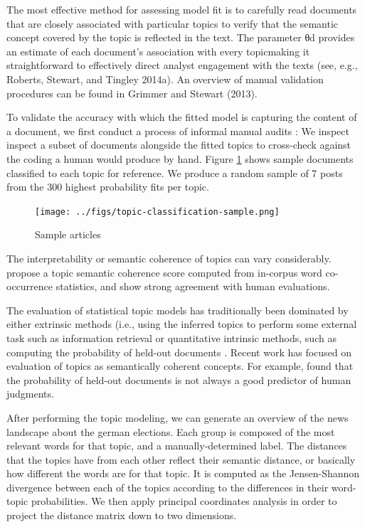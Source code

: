 \documentclass[12pt,a4paper,notitlepage]{article}
\begin{document}
The most effective method for assessing model fit is to carefully read documents that are closely associated with particular topics to verify that the semantic concept covered by the topic is reflected in the text. The parameter θd provides an estimate of each document’s association with every topicmaking it straightforward to effectively direct analyst engagement with the texts (see, e.g., Roberts, Stewart, and Tingley 2014a). An overview of manual validation procedures can be found in Grimmer and Stewart (2013).\cite{roberts_model_2016}

To validate the accuracy with which the fitted model is capturing the content of a document, we first conduct a process of informal manual audits \citep{gentzkow_text_2017}: We inspect inspect a subset of documents alongside the fitted topics to cross-check against the coding a human would produce by hand. Figure \ref{fig_classification} shows sample documents classified to each topic for reference. We produce a random sample of 7 posts from the 300 highest probability fits per topic.

\begin{figure}[H]
\centering
	\caption{Sample articles}
	\texttt{[image: ../figs/topic-classification-sample.png]}	
	\label{fig_classification}
\end{figure}

The interpretability or semantic coherence of topics can vary considerably. \citet{mimno_optimizing_2011} propose a topic semantic coherence score computed from in-corpus word co-occurrence statistics, and show strong agreement with human evaluations. 

\cite{mimno_optimizing_2011}
The evaluation of statistical topic models has traditionally been dominated by either extrinsic methods (i.e., using the inferred topics to perform some external task such as information retrieval \citep{wei_lda-based_2006} or quantitative intrinsic methods, such as computing the probability of held-out documents \citep{wallach_evaluation_2009}. Recent work has focused on evaluation of topics as semantically coherent concepts. For example, \citet{chang_reading_2009} found that the probability of held-out documents is not always a good predictor of human judgments.


After performing the topic modeling, we can generate an overview of the news landscape about the german elections. Each group is composed of the most relevant words for that topic, and a manually-determined label. The distances that the topics have from each other reflect their semantic distance, or basically how different the words are for that topic. It is computed as the Jensen-Shannon divergence between each of the topics according to the differences in their word-topic probabilities. We then apply principal coordinates analysis in order to project the distance matrix down to two dimensions.
\end{document}
